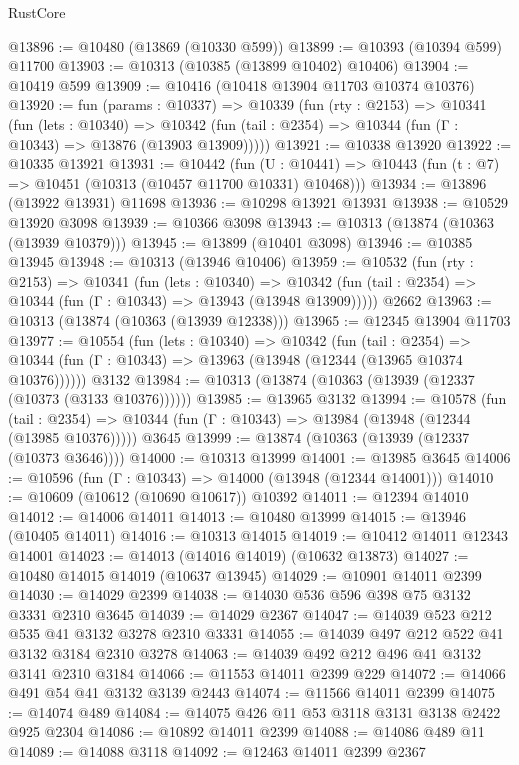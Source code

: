 \begin{lexlean}{RustCore}
\begin{coremodule}
@13896 := @10480 (@13869 (@10330 @599))
@13899 := @10393 (@10394 @599) @11700
@13903 := @10313 (@10385 (@13899 @10402) @10406)
@13904 := @10419 @599
@13909 := @10416 (@10418 @13904 @11703 @10374 @10376)
@13920 := fun (params : @10337) =>
  @10339
    (fun (rty : @2153) =>
    @10341
      (fun (lets : @10340) =>
      @10342 (fun (tail : @2354) => @10344 (fun (Γ : @10343) => @13876 (@13903 @13909)))))
@13921 := @10338 @13920
@13922 := @10335 @13921
@13931 := @10442
    (fun (U : @10441) => @10443 (fun (t : @7) => @10451 (@10313 (@10457 @11700 @10331) @10468)))
@13934 := @13896 (@13922 @13931) @11698
@13936 := @10298 @13921 @13931
@13938 := @10529 @13920 @3098
@13939 := @10366 @3098
@13943 := @10313 (@13874 (@10363 (@13939 @10379)))
@13945 := @13899 (@10401 @3098)
@13946 := @10385 @13945
@13948 := @10313 (@13946 @10406)
@13959 := @10532
    (fun (rty : @2153) =>
    @10341
      (fun (lets : @10340) =>
      @10342 (fun (tail : @2354) => @10344 (fun (Γ : @10343) => @13943 (@13948 @13909)))))
    @2662
@13963 := @10313 (@13874 (@10363 (@13939 @12338)))
@13965 := @12345 @13904 @11703
@13977 := @10554
    (fun (lets : @10340) =>
    @10342
      (fun (tail : @2354) =>
      @10344 (fun (Γ : @10343) => @13963 (@13948 (@12344 (@13965 @10374 @10376))))))
    @3132
@13984 := @10313 (@13874 (@10363 (@13939 (@12337 (@10373 (@3133 @10376))))))
@13985 := @13965 @3132
@13994 := @10578
    (fun (tail : @2354) => @10344 (fun (Γ : @10343) => @13984 (@13948 (@12344 (@13985 @10376)))))
    @3645
@13999 := @13874 (@10363 (@13939 (@12337 (@10373 @3646))))
@14000 := @10313 @13999
@14001 := @13985 @3645
@14006 := @10596 (fun (Γ : @10343) => @14000 (@13948 (@12344 @14001)))
@14010 := @10609 (@10612 (@10690 @10617)) @10392
@14011 := @12394 @14010
@14012 := @14006 @14011
@14013 := @10480 @13999
@14015 := @13946 (@10405 @14011)
@14016 := @10313 @14015
@14019 := @10412 @14011 @12343 @14001
@14023 := @14013 (@14016 @14019) (@10632 @13873)
@14027 := @10480 @14015 @14019 (@10637 @13945)
@14029 := @10901 @14011 @2399
@14030 := @14029 @2399
@14038 := @14030 @536 @596 @398 @75 @3132 @3331 @2310 @3645
@14039 := @14029 @2367
@14047 := @14039 @523 @212 @535 @41 @3132 @3278 @2310 @3331
@14055 := @14039 @497 @212 @522 @41 @3132 @3184 @2310 @3278
@14063 := @14039 @492 @212 @496 @41 @3132 @3141 @2310 @3184
@14066 := @11553 @14011 @2399 @229
@14072 := @14066 @491 @54 @41 @3132 @3139 @2443
@14074 := @11566 @14011 @2399
@14075 := @14074 @489
@14084 := @14075 @426 @11 @53 @3118 @3131 @3138 @2422 @925 @2304
@14086 := @10892 @14011 @2399
@14088 := @14086 @489 @11
@14089 := @14088 @3118
@14092 := @12463 @14011 @2399 @2367

\end{coremodule}
\end{lexlean}
